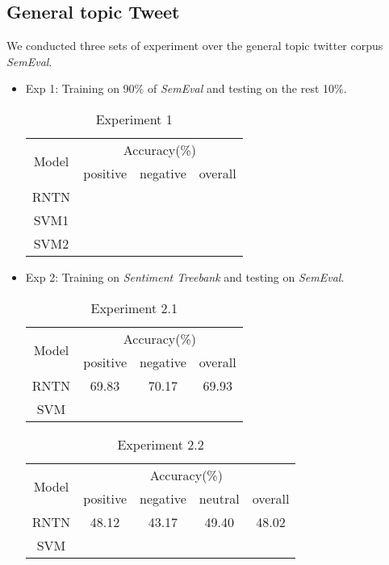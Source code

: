 \subsection{General topic Tweet}
We conducted three sets of experiment over the general topic twitter corpus \textit{SemEval}. 
\begin{itemize}
\item Exp 1: Training on 90\% of \textit{SemEval} and testing on the rest 10\%. 
\begin{table}[H]
  \begin{center}
    \begin{tabular}{cccc}\hline
      \multirow{2}{*}{Model} 
      & \multicolumn{3}{c}{Accuracy(\%)} \\\cline{2-4}
    & positive & negative & overall \\ \hline
    RNTN  &          &    	    &       \\ 
    SVM1  & ~        &          &         \\ 
    SVM2  & ~        &          &         \\ \hline
    \end{tabular}
    \end{center}
    \caption{\label{exp5_1} Experiment 1}
\end{table}

\item Exp 2: Training on \textit{Sentiment Treebank} and testing on \textit{SemEval}.  

\begin{table}[H]
  \begin{center}
    \begin{tabular}{cccc}\hline
      \multirow{2}{*}{Model} 
      & \multicolumn{3}{c}{Accuracy(\%)} \\\cline{2-4}
    & positive & negative & overall \\ \hline
    RNTN  & 69.83     &   70.17	    &   69.93    \\ 
    SVM   & ~        &          &         \\ \hline
    \end{tabular}
    \end{center}
    \caption{\label{exp5_2_1} Experiment 2.1}
\end{table}

\begin{table}[H]
  \begin{center}
    \begin{tabular}{ccccc}\hline
      \multirow{2}{*}{Model} 
      & \multicolumn{4}{c}{Accuracy(\%)} \\\cline{2-5}
    & positive & negative & neutral & overall \\ \hline
    RNTN  & 48.12    &   43.17  	   &   49.40       & 48.02    \\ 
    SVM  & ~        &          &             & \\ \hline
    \end{tabular}
    \end{center}
    \caption{\label{exp5_2_2} Experiment 2.2}
\end{table}




\end{itemize}
